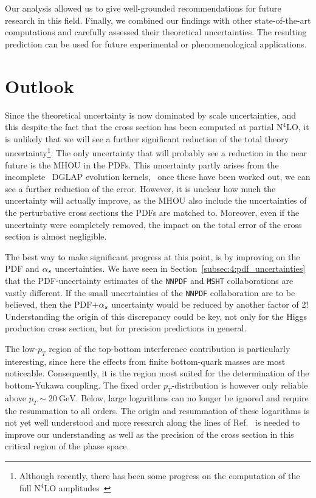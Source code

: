 Our analysis allowed us to give well-grounded recommendations for future research in this field. Finally, we combined our findings with other state-of-the-art computations and carefully assessed their theoretical uncertainties. The resulting prediction can be used for future experimental or phenomenological applications.

\section{Outlook}
Since the theoretical uncertainty is now dominated by scale uncertainties, and this despite the fact that the cross section has been computed at partial N${}^4$LO, it is unlikely that we will see a further significant reduction of the total theory uncertainty\footnote{Although recently, there has been some progress on the computation of the full N${}^4$LO amplitudes~\cite{Chen:2025utl}}. The only uncertainty that will probably see a reduction in the near future is the \acs{MHOU} in the \acs{PDF}s. This uncertainty partly arises from the incomplete \NNNLO\ DGLAP evolution kernels, \ie\ once these have been worked out, we can see a further reduction of the error. However, it is unclear how much the uncertainty will actually improve, as the \acs{MHOU} also include the uncertainties of the perturbative cross sections the \acs{PDF}s are matched to. Moreover, even if the uncertainty were completely removed, the impact on the total error of the cross section is almost negligible.

The best way to make significant progress at this point, is by improving on the \acs{PDF} and $\alpha_s$ uncertainties. We have seen in Section~\ref{subsec:4:pdf_uncertainties} that the \acs{PDF}-uncertainty estimates of the \texttt{NNPDF} and \texttt{MSHT} collaborations are vastly different. If the small uncertainties of the \texttt{NNPDF} collaboration are to be believed, then the \acs{PDF}$ + \alpha_s$ uncertainty would be reduced by another factor of 2! Understanding the origin of this discrepancy could be key, not only for the Higgs production cross section, but for precision predictions in general.

The low-$p_T$ region of the top-bottom interference contribution is particularly interesting, since here the effects from finite bottom-quark masses are most noticeable. Consequently, it is the region most suited for the determination of the bottom-Yukawa coupling. The fixed order $p_T$-distribution is however only reliable above $p_T \sim 20 \ \mathrm{GeV}$. Below, large logarithms can no longer be ignored and require the resummation to all orders. The origin and resummation of these logarithms is not yet well understood and more research along the lines of Ref.~\cite{Caola:2018zye, Liu:2017vkm} is needed to improve our understanding as well as the precision of the cross section in this critical region of the phase space.

